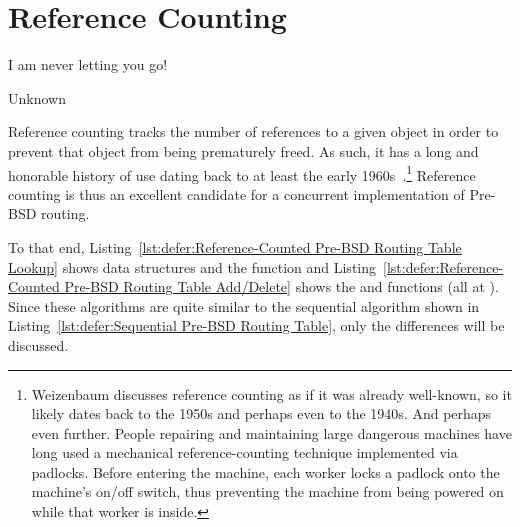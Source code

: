 
\section{Reference Counting}
\label{sec:defer:Reference Counting}
%
\epigraph{I am never letting you go!}{Unknown}

\begin{listing}[tbp]

\caption{Reference-Counted Pre-BSD Routing Table Lookup (BUGGY!!!)}
\label{lst:defer:Reference-Counted Pre-BSD Routing Table Lookup}
\end{listing}

\begin{listing}[tbp]

\caption{Reference-Counted Pre-BSD Routing Table Add\slash Delete (BUGGY!!!)}
\label{lst:defer:Reference-Counted Pre-BSD Routing Table Add/Delete}
\end{listing}

%
Reference counting tracks the number of references to a given object in
order to prevent that object from being prematurely freed.
As such, it has a long and honorable history of use dating back to
at least the early
1960s~\cite{Weizenbaum:1963:SLP:367593.367617}.\footnote{
	Weizenbaum discusses reference counting as if it was already
	well-known, so it likely dates back to the 1950s and perhaps
	even to the 1940s.
	And perhaps even further.
	People repairing and maintaining large dangerous machines have long
	used a mechanical reference-counting technique implemented via
	padlocks.
	Before entering the machine, each worker locks a padlock onto
	the machine's on/off switch, thus preventing the machine from
	being powered on while that worker is inside.}
Reference counting is thus an excellent candidate for a concurrent
implementation of Pre-BSD routing.

To that end,
Listing~\ref{lst:defer:Reference-Counted Pre-BSD Routing Table Lookup}
shows data structures and the  function and
Listing~\ref{lst:defer:Reference-Counted Pre-BSD Routing Table Add/Delete}
shows the  and  functions
(all at ).
Since these algorithms are quite similar to the sequential algorithm
shown in
Listing~\ref{lst:defer:Sequential Pre-BSD Routing Table},
only the differences will be discussed.

